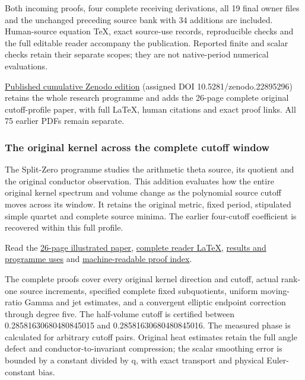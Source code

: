 \documentclass[
]{article}
\begin{document}
Both incoming proofs, four complete receiving derivations, all 19 final
owner files and the unchanged preceding source bank with 34 additions
are included. Human-source equation TeX, exact source-use records,
reproducible checks and the full editable reader accompany the
publication. Reported finite and scalar checks retain their separate
scopes; they are not native-period numerical evaluations.

\href{https://zenodo.org/records/22895296}{Published cumulative Zenodo
edition} (assigned DOI 10.5281/zenodo.22895296) retains the whole
research programme and adds the 26-page complete original cutoff-profile
paper, with full LaTeX, human citations and exact proof links. All 75
earlier PDFs remain separate.

\subsubsection{The original kernel across the complete cutoff
window}\label{the-original-kernel-across-the-complete-cutoff-window}

The Split-Zero programme studies the arithmetic theta source, its
quotient and the original conductor observation. This addition evaluates
how the entire original kernel spectrum and volume change as the
polynomial source cutoff moves across its window. It retains the
original metric, fixed period, stipulated simple quartet and complete
source minima. The earlier four-cutoff coefficient is recovered within
this full profile.

Read the
\href{https://github.com/KokunoYumeto/zeta-function-research-reader/blob/main/workbenches/splitzero-tandem/continuations/20260922-cutoff-profile/CUTOFF_PROFILE_READER.pdf}{26-page
illustrated paper},
\href{https://github.com/KokunoYumeto/zeta-function-research-reader/blob/main/workbenches/splitzero-tandem/continuations/20260922-cutoff-profile/CUTOFF_PROFILE_READER.tex}{complete
reader LaTeX},
\href{https://github.com/KokunoYumeto/zeta-function-research-reader/blob/main/workbenches/splitzero-tandem/continuations/20260922-cutoff-profile/RESULTS_20260922_025.md}{results
and programme uses} and
\href{https://github.com/KokunoYumeto/zeta-function-research-reader/blob/main/workbenches/splitzero-tandem/continuations/20260922-cutoff-profile/RESULT_INDEX.json}{machine-readable
proof index}.

The complete proofs cover every original kernel direction and cutoff,
actual rank-one source increments, specified complete fixed
subquotients, uniform moving-ratio Gamma and jet estimates, and a
convergent elliptic endpoint correction through degree five. The
half-volume cutoff is certified between 0.28581630680480845015 and
0.28581630680480845016. The measured phase is calculated for arbitrary
cutoff pairs. Original heat estimates retain the full angle defect and
conductor-to-invariant compression; the scalar smoothing error is
bounded by a constant divided by q, with exact transport and physical
Euler-constant bias.
\end{document}
